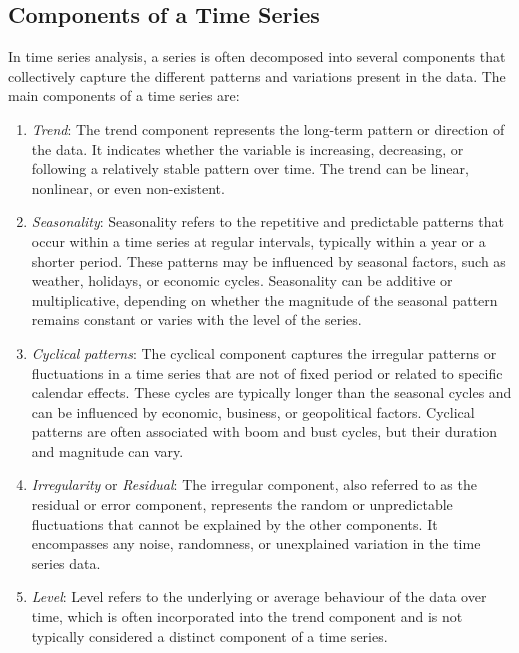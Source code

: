 \documentclass[
]{article}
\providecommand{\tightlist}{%
  \setlength{\itemsep}{0pt}\setlength{\parskip}{0pt}}
\begin{document}
\hypertarget{components-of-a-time-series}{%
\subsection{Components of a Time
Series}\label{components-of-a-time-series}}

In time series analysis, a series is often decomposed into several
components that collectively capture the different patterns and
variations present in the data. The main components of a time series
are:~

\begin{enumerate}
\def\labelenumi{\arabic{enumi}.}
\tightlist
\item
  \emph{Trend}: The trend component represents the long-term pattern or
  direction of the data. It indicates whether the variable is
  increasing, decreasing, or following a relatively stable pattern over
  time. The trend can be linear, nonlinear, or even non-existent.
\item
  \emph{Seasonality}: Seasonality refers to the repetitive and
  predictable patterns that occur within a time series at regular
  intervals, typically within a year or a shorter period. These patterns
  may be influenced by seasonal factors, such as weather, holidays, or
  economic cycles. Seasonality can be additive or multiplicative,
  depending on whether the magnitude of the seasonal pattern remains
  constant or varies with the level of the series.~
\item
  \emph{Cyclical} \emph{patterns}: The cyclical component captures the
  irregular patterns or fluctuations in a time series that are not of
  fixed period or related to specific calendar effects. These cycles are
  typically longer than the seasonal cycles and can be influenced by
  economic, business, or geopolitical factors. Cyclical patterns are
  often associated with boom and bust cycles, but their duration and
  magnitude can vary.~
\item
  \emph{Irregularity} or \emph{Residual}: The irregular component, also
  referred to as the residual or error component, represents the random
  or unpredictable fluctuations that cannot be explained by the other
  components. It encompasses any noise, randomness, or unexplained
  variation in the time series data.
\item
  \emph{Level}: Level refers to the underlying or average behaviour of
  the data over time, which is often incorporated into the trend
  component and is not typically considered a distinct component of a
  time series.
\end{enumerate}
\end{document}
